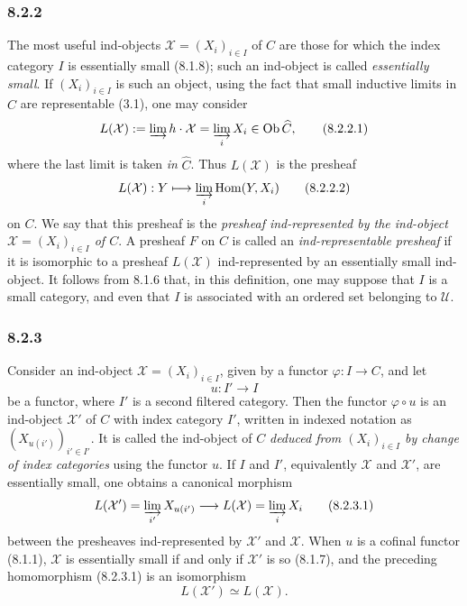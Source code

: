 \documentclass[11pt]{article}
\newcommand{\U}{\mathcal{U}}
\newcommand{\Ob}{\operatorname{Ob}}
\newcommand{\Hom}{\operatorname{Hom}}
\begin{document}
\subsubsection*{8.2.2}
The most useful ind-objects $\mathcal X=(X_i)_{i\in I}$ of $C$ are those for which the index category $I$ is essentially small (8.1.8); such an ind-object is called \emph{essentially small}. If $(X_i)_{i\in I}$ is such an object, using the fact that small inductive limits in $\widehat C$ are representable (3.1), one may consider
\[
L(\mathcal X)\mathrel{:=}\varinjlim h\cdot\mathcal X=\varinjlim_i X_i\in\Ob\widehat C,
\tag{8.2.2.1}
\]
where the last limit is taken \emph{in} $\widehat C$. Thus $L(\mathcal X)$ is the presheaf
\[
L(\mathcal X):Y\longmapsto \varinjlim_i\Hom(Y,X_i)
\tag{8.2.2.2}
\]
on $C$. We say that this presheaf is the \emph{presheaf ind-represented by the ind-object $\mathcal X=(X_i)_{i\in I}$ of $C$}. A presheaf $F$ on $C$ is called an \emph{ind-representable presheaf} if it is isomorphic to a presheaf $L(\mathcal X)$ ind-represented by an essentially small ind-object. It follows from 8.1.6 that, in this definition, one may suppose that $I$ is a small category, and even that $I$ is associated with an ordered set belonging to $\U$.

\subsubsection*{8.2.3}
Consider an ind-object $\mathcal X=(X_i)_{i\in I}$, given by a functor $\varphi:I\to C$, and let
\[
u:I'\longrightarrow I
\]
be a functor, where $I'$ is a second filtered category. Then the functor $\varphi\circ u$ is an ind-object $\mathcal X'$ of $C$ with index category $I'$, written in indexed notation as $(X_{u(i')})_{i'\in I'}$. It is called the ind-object of $C$ \emph{deduced from $(X_i)_{i\in I}$ by change of index categories} using the functor $u$. If $I$ and $I'$, equivalently $\mathcal X$ and $\mathcal X'$, are essentially small, one obtains a canonical morphism
\[
L(\mathcal X')=\varinjlim_{i'}X_{u(i')}\longrightarrow L(\mathcal X)=\varinjlim_i X_i
\tag{8.2.3.1}
\]
between the presheaves ind-represented by $\mathcal X'$ and $\mathcal X$. When $u$ is a cofinal functor (8.1.1), $\mathcal X$ is essentially small if and only if $\mathcal X'$ is so (8.1.7), and the preceding homomorphism (8.2.3.1) is an isomorphism
\[
L(\mathcal X')\simeq L(\mathcal X).
\tag{8.2.3.2}
\]
\end{document}
